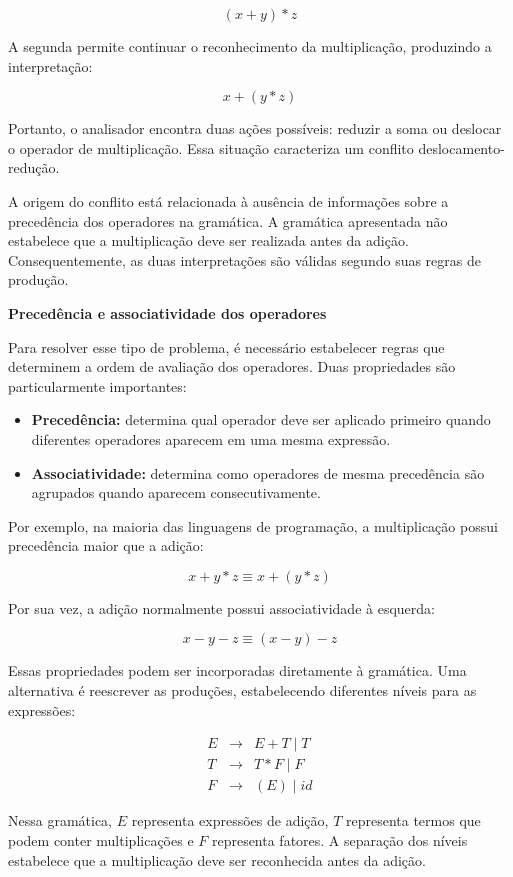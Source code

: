 \documentclass[
  brazilian,
  letterpaper,
]{book}
\providecommand{\tightlist}{%
  \setlength{\itemsep}{0pt}\setlength{\parskip}{0pt}}
\theoremstyle{plain}
\theoremstyle{definition}
\theoremstyle{remark}
\begin{document}
\[
(x+y)*z
\]

A segunda permite continuar o reconhecimento da multiplicação,
produzindo a interpretação:

\[
x+(y*z)
\]

Portanto, o analisador encontra duas ações possíveis: reduzir a soma ou
deslocar o operador de multiplicação. Essa situação caracteriza um
conflito deslocamento-redução.

A origem do conflito está relacionada à ausência de informações sobre a
precedência dos operadores na gramática. A gramática apresentada não
estabelece que a multiplicação deve ser realizada antes da adição.
Consequentemente, as duas interpretações são válidas segundo suas regras
de produção.

\textbf{Precedência e associatividade dos operadores}

Para resolver esse tipo de problema, é necessário estabelecer regras que
determinem a ordem de avaliação dos operadores. Duas propriedades são
particularmente importantes:

\begin{itemize}
\tightlist
\item
  \textbf{Precedência:} determina qual operador deve ser aplicado
  primeiro quando diferentes operadores aparecem em uma mesma expressão.
\item
  \textbf{Associatividade:} determina como operadores de mesma
  precedência são agrupados quando aparecem consecutivamente.
\end{itemize}

Por exemplo, na maioria das linguagens de programação, a multiplicação
possui precedência maior que a adição:

\[
x+y*z \equiv x+(y*z)
\]

Por sua vez, a adição normalmente possui associatividade à esquerda:

\[
x-y-z \equiv (x-y)-z
\]

Essas propriedades podem ser incorporadas diretamente à gramática. Uma
alternativa é reescrever as produções, estabelecendo diferentes níveis
para as expressões:

\[
\begin{array}{rcl}\
E &\rightarrow& E+T \mid T\\\
T &\rightarrow& T*F \mid F\\\
F &\rightarrow& (E) \mid id\
\end{array}
\]

Nessa gramática, \(E\) representa expressões de adição, \(T\) representa
termos que podem conter multiplicações e \(F\) representa fatores. A
separação dos níveis estabelece que a multiplicação deve ser reconhecida
antes da adição.
\end{document}
